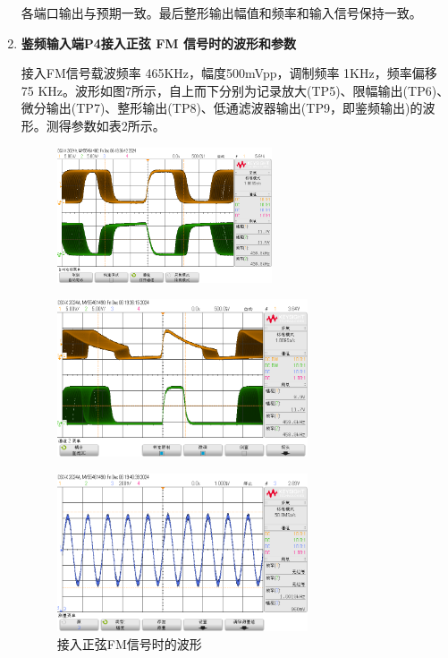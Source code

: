 \documentclass[UTF8]{ctexart}
\begin{document}
\begin{enumerate}[(1)]
    各端口输出与预期一致。最后整形输出幅值和频率和输入信号保持一致。

    \item \textbf{鉴频输入端P4接入正弦 FM 信号时的波形和参数}

    接入FM信号载波频率 465KHz，幅度500mVpp，调制频率 1KHz，频率偏移 75 KHz。波形如图7所示，自上而下分别为记录放大(TP5)、限幅输出(TP6)、微分输出(TP7)、整形输出(TP8)、低通滤波器输出(TP9，即鉴频输出)的波形。测得参数如表2所示。

    \begin{figure}[H]
        \centering
        \includegraphics[width=0.6\textwidth]{pics/13.png}
    \end{figure}
    \begin{figure}[H]
        \centering
        \includegraphics[width=0.7\textwidth]{pics/14.png}
    \end{figure}
    \begin{figure}[H]
        \centering
        \includegraphics[width=0.7\textwidth]{pics/15.png}
        \caption{接入正弦FM信号时的波形}\label{fig:12}
    \end{figure}
    \begin{table}[!ht]
        \centering


\end{table}
\end{enumerate}
\end{document}
